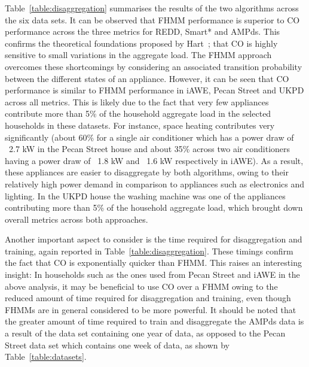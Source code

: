 \documentclass{sig-alternate}
\newcommand{\bluecolor}[1]{\textcolor{blue}{#1}}
\newcommand{\tabref}[1]{Table~\ref{#1}}
\begin{document}
\tabref{table:disaggregation} summarises the results of the two algorithms across the six data sets. It can be observed that FHMM performance is superior to CO performance across the three metrics for REDD, Smart* and AMPds. This confirms the theoretical foundations proposed by Hart~\cite{hart_1992}; that CO is highly sensitive to small variations in the aggregate load. The FHMM approach overcomes these shortcomings by considering an associated transition probability between the different states of an appliance. However, it can be seen that CO performance is similar to FHMM performance in iAWE, Pecan Street and UKPD across all metrics. This is likely due to the fact that very few appliances contribute more than 5\% of the household aggregate load in the selected households in these datasets. For instance, space heating contributes very significantly (about 60\% for a single air conditioner which has a power draw of ~2.7 kW in the Pecan Street house and about 35\% across two air conditioners having a power draw of ~1.8 kW and ~1.6 kW respectively in iAWE). As a result, these appliances are easier to disaggregate by both algorithms, owing to their relatively high power demand in comparison to appliances such as electronics and lighting. In the UKPD house the washing machine was one of the appliances contributing more than 5\% of the household aggregate load, which brought down overall metrics across both approaches. 

Another important aspect to consider is the time required for disaggregation and training, again reported in \tabref{table:disaggregation}. These timings confirm the fact that CO is exponentially quicker than FHMM. This raises an interesting insight: In households such as the ones used from Pecan Street and iAWE in the above analysis, it may be beneficial to use CO over a FHMM owing to the reduced amount of time required for disaggregation and training, even though FHMMs are in general considered to be more powerful. It should be noted that the greater amount of time required to train and disaggregate the AMPds data is a result of the data set containing one year of data, as opposed to the Pecan Street data set which contains one week of data, as shown by \tabref{table:datasets}.
\end{document}
